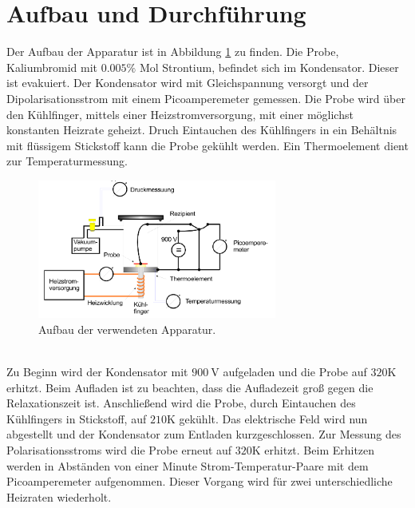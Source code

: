 \section{Aufbau und Durchführung}
\label{sec:Durchführung}
Der Aufbau der Apparatur ist in Abbildung \ref{fig:aufbau}
zu finden. Die Probe, Kaliumbromid mit $0.005\%$ Mol Strontium, befindet sich im Kondensator.
Dieser ist evakuiert.
Der Kondensator wird mit Gleichspannung versorgt und der Dipolarisationsstrom mit einem Picoamperemeter gemessen.
Die Probe wird über den Kühlfinger, mittels einer Heizstromversorgung, mit einer möglichst konstanten
Heizrate geheizt.
Druch Eintauchen des Kühlfingers in ein Behältnis mit flüssigem Stickstoff kann die Probe gekühlt
werden. Ein Thermoelement dient zur Temperaturmessung.
\begin{figure}
    \centering
    \includegraphics[width=0.7\textwidth]{aufbau.PNG}
    \caption{Aufbau der verwendeten Apparatur.\cite{skript}}
    \label{fig:aufbau}
\end{figure}\\
Zu Beginn wird der Kondensator mit $900\ \si{\volt}$ aufgeladen und die Probe auf $320\mathrm{K}$ erhitzt.
Beim Aufladen ist zu beachten, dass die Aufladezeit groß gegen die Relaxationszeit ist.
Anschließend wird die Probe, durch Eintauchen des Kühlfingers in Stickstoff,
auf $210\mathrm{K}$ gekühlt.
Das elektrische Feld wird nun abgestellt und der Kondensator zum Entladen kurzgeschlossen.
Zur Messung des Polarisationsstroms wird die Probe erneut auf $320\mathrm{K}$ erhitzt.
Beim Erhitzen werden in Abständen von einer Minute Strom-Temperatur-Paare mit dem Picoamperemeter aufgenommen.
Dieser Vorgang wird für zwei unterschiedliche Heizraten wiederholt.
